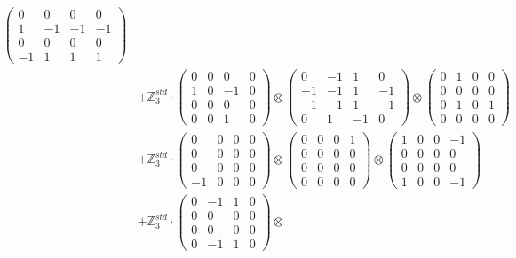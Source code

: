 \documentclass{article}
\begin{document}
{\begin{align}
            \begin{pmatrix} 0 & 0 & 0 & 0 \\ 1 & -1 & -1 & -1 \\ 0 & 0 & 0 & 0 \\ -1 & 1 & 1 & 1 \end{pmatrix} \\ 
        &+ \label{Rs16-Rc11-Solution-9-c25} \mathbb{Z}_3^{std} \cdot 
            \begin{pmatrix} 0 & 0 & 0 & 0 \\ 1 & 0 & -1 & 0 \\ 0 & 0 & 0 & 0 \\ 0 & 0 & 1 & 0 \end{pmatrix} \otimes 
            \begin{pmatrix} 0 & -1 & 1 & 0 \\ -1 & -1 & 1 & -1 \\ -1 & -1 & 1 & -1 \\ 0 & 1 & -1 & 0 \end{pmatrix} \otimes 
            \begin{pmatrix} 0 & 1 & 0 & 0 \\ 0 & 0 & 0 & 0 \\ 0 & 1 & 0 & 1 \\ 0 & 0 & 0 & 0 \end{pmatrix} \\ 
        &+ \label{Rs16-Rc11-Solution-9-c26} \mathbb{Z}_3^{std} \cdot 
            \begin{pmatrix} 0 & 0 & 0 & 0 \\ 0 & 0 & 0 & 0 \\ 0 & 0 & 0 & 0 \\ -1 & 0 & 0 & 0 \end{pmatrix} \otimes 
            \begin{pmatrix} 0 & 0 & 0 & 1 \\ 0 & 0 & 0 & 0 \\ 0 & 0 & 0 & 0 \\ 0 & 0 & 0 & 0 \end{pmatrix} \otimes 
            \begin{pmatrix} 1 & 0 & 0 & -1 \\ 0 & 0 & 0 & 0 \\ 0 & 0 & 0 & 0 \\ 1 & 0 & 0 & -1 \end{pmatrix} \\ 
        &+ \label{Rs16-Rc11-Solution-9-c27} \mathbb{Z}_3^{std} \cdot 
            \begin{pmatrix} 0 & -1 & 1 & 0 \\ 0 & 0 & 0 & 0 \\ 0 & 0 & 0 & 0 \\ 0 & -1 & 1 & 0 \end{pmatrix} \otimes 

\end{align}}
\end{document}
